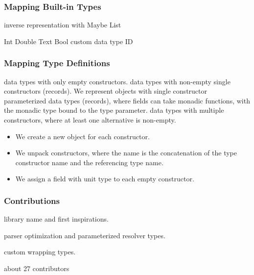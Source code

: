 \begin{frame}\frametitle{Mapping Built-in Types}
\begin{itemize}
  \begin{itemize}
     inverse representation with Maybe
     List
  \end{itemize}
  \begin{itemize}
     Int
     Double
     Text
     Bool
     custom data type ID 
  \end{itemize}
\end{itemize}
\end{frame}

\begin{frame}\frametitle{Mapping Type Definitions}

\begin{itemize}
   data types with only empty constructors.
   data types with non-empty single constructors (records). 
   We represent objects with single constructor parameterized data types (records), where fields can take monadic functions, with the monadic type bound to the type parameter. 
   data types with multiple constructors, where at least one alternative is non-empty.
  \begin{itemize}
    \item We create a new object for each constructor.
    \item We unpack constructors, where the name is the concatenation of the type constructor name and the referencing type name. 
    \item We assign a field with unit type to each empty constructor.
  \end{itemize}
\end{itemize}

\end{frame}

\begin{frame}\frametitle{Contributions}

\begin{itemize} 
  
     library name and first inspirations.

     parser optimization and parameterized resolver types.
    
     custom wrapping types.

      about 27 contributors

\end{itemize}

\end{frame}